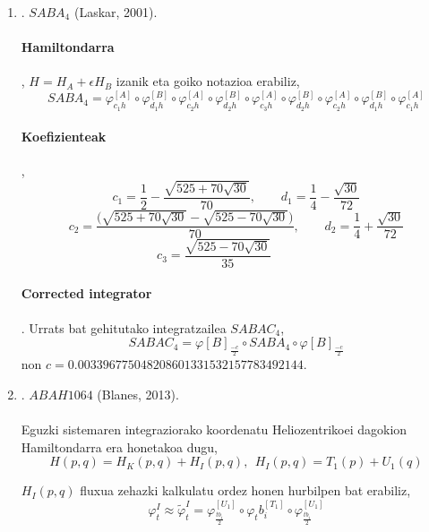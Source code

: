 \begin{enumerate}
\item. $SABA_4$ (Laskar, 2001).

\paragraph*{Hamiltondarra}, $H=H_A+\epsilon H_B$ izanik eta goiko notazioa erabiliz,
\[SABA_4=\varphi^{[A]}_{c_1 h} \circ \varphi^{[B]}_{d_1 h} \circ \varphi^{[A]}_{c_2 h} \circ \varphi^{[B]}_{d_2 h}
         \circ  \varphi^{[A]}_{c_3 h}   \circ
          \varphi^{[B]}_{d_2 h} \circ \varphi^{[A]}_{c_2 h} \circ   \varphi^{[B]}_{d_1 h}\circ  \varphi^{[A]}_{c_1 h}
\]

\paragraph*{Koefizienteak},
\[c_1=\frac{1}{2}-\frac{\sqrt{525+70\sqrt{30}}}{70} , \ \ \ \ \ \ \ \ \ d_1=\frac{1}{4}-\frac{\sqrt{30}}{72}\]
\[c_2=\frac{\big( \sqrt{525+70 \sqrt{30}}-\sqrt{525-70 \sqrt{30}} \big)}{70} , \ \ \ \ \ \ \ \ \ d_2=\frac{1}{4}+\frac{\sqrt{30}}{72}\]
\[c_3=\frac{\sqrt{525-70\sqrt{30}}}{35} \ \ \ \ \ \ \ \ \ \ \ \ \ \ \ \ \]

\paragraph*{Corrected integrator}.
Urrats bat gehitutako integratzailea $SABAC_4$,
\[SABAC_4=\varphi{[B]}_\frac{-c}{2} \circ SABA_4 \circ \varphi{[B]}_\frac{-c}{2}\] 
non $c=0.003396775048208601331532157783492144$.\\

\item. $ABAH1064$ (Blanes, 2013).

\paragraph*{}Eguzki sistemaren integraziorako koordenatu Heliozentrikoei dagokion Hamiltondarra era honetakoa dugu,
\begin{equation*}
H(p,q)=H_K(p,q)+H_I(p,q), \ \ H_I(p,q)=T_1(p)+U_1(q) 
\end{equation*}

$H_I(p,q)$ fluxua zehazki kalkulatu ordez honen hurbilpen bat erabiliz,
\begin{equation*}
\varphi_t^I \approx \tilde{\varphi}_t^I= \varphi_{\frac{tb_i}{2}}^{[U_1]} \circ \varphi_tb_i^{[T_1]} \circ \varphi_{\frac{tb_i}{2}}^{[U_1]}
\end{equation*}


\end{enumerate}
